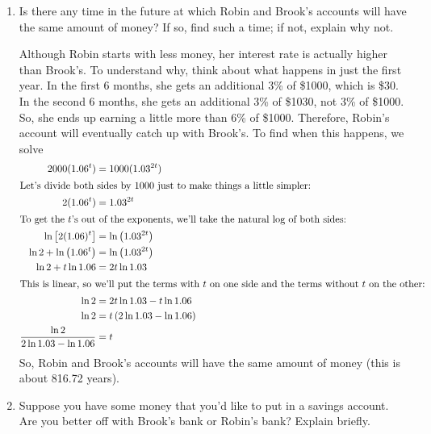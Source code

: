 \documentclass{article}
\theoremstyle{theorem}
\begin{document}
\begin{enumerate}
\begin{enumerate}
  \item
    \begin{problem}[\vfill]
      Is there any time in the future at which Robin and Brook's accounts
      will have the same amount of money?  If so, find such a time; if
      not, explain why not. 
    \end{problem}

    \begin{solution}
      Although Robin starts with less money, her interest rate is actually higher than Brook's. To understand why, think about what happens in just the first year. In the first 6 months, she gets an additional 3\% of \$1000, which is \$30. In the second 6 months, she gets an additional 3\% of \$1030, not 3\% of \$1000. So, she ends up earning a little more than 6\% of \$1000. Therefore, Robin's account will eventually catch up with Brook's. To find when this happens, we solve
      \begin{align*}
        2000 (1.06^t) &= 1000 (1.03^{2t}) \\
        \intertext{Let's divide both sides by 1000 just to make things a
          little simpler:}
        2 (1.06^t) &= 1.03^{2t} \\
        \shortintertext{To get the $t$'s out of the exponents, we'll take
          the natural log of both sides:}
        \ln \left[ 2 (1.06)^t \right] &= \ln \left( 1.03^{2t} \right) \\
        \ln 2 + \ln \left( 1.06^t \right) &= \ln \left( 1.03^{2t} \right)
        \\
        \ln 2 + t \ln 1.06 &= 2t \ln 1.03 \\
        \intertext{This is linear, so we'll put the terms with $t$ on one side and the terms without $t$ on the other:}
        \ln 2 &= 2t \ln 1.03 - t \ln 1.06 \\
        \ln 2 &= t \left( 2 \ln 1.03 - \ln 1.06 \right) \\
        \frac{\ln 2}{2 \ln 1.03 - \ln 1.06} &= t
      \end{align*}
      So, Robin and Brook's accounts will have the same amount of money
      (this is about 816.72 years).
    \end{solution}

  \item
    \begin{problem}[\nstretch{0.5}]
      Suppose you have some money that you'd like to put in a savings
      account.  Are you better off with Brook's bank or Robin's bank?
      Explain briefly.
    \end{problem}


\end{enumerate}
\end{enumerate}
\end{document}
